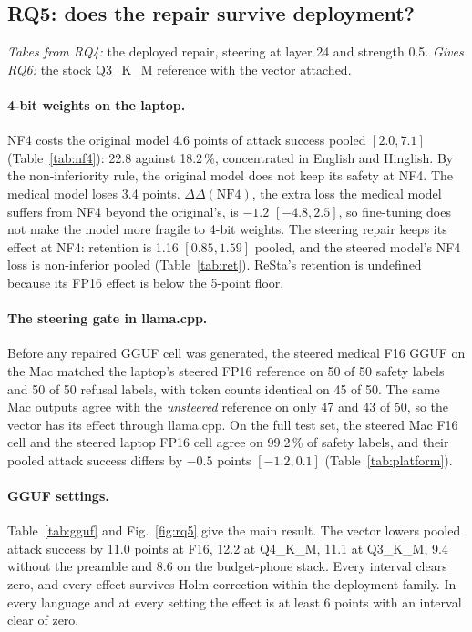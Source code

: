 \subsection{RQ5: does the repair survive deployment?}\label{sec:rq5}

\emph{Takes from RQ4:} the deployed repair, steering at layer 24 and strength 0.5. \emph{Gives RQ6:} the stock Q3\_K\_M reference with the vector attached.

\paragraph{4-bit weights on the laptop.} NF4 costs the original model 4.6 points of attack success pooled $[2.0, 7.1]$ (Table~\ref{tab:nf4}): 22.8 against 18.2\,\%, concentrated in English and Hinglish. By the non-inferiority rule, the original model does not keep its safety at NF4. The medical model loses 3.4 points. $\Delta\Delta(\mathrm{NF4})$, the extra loss the medical model suffers from NF4 beyond the original's, is $-1.2$ $[-4.8, 2.5]$, so fine-tuning does not make the model more fragile to 4-bit weights. The steering repair keeps its effect at NF4: retention is 1.16 $[0.85, 1.59]$ pooled, and the steered model's NF4 loss is non-inferior pooled (Table~\ref{tab:ret}). ReSta's retention is undefined because its FP16 effect is below the 5-point floor.



\paragraph{The steering gate in llama.cpp.} Before any repaired GGUF cell was generated, the steered medical F16 GGUF on the Mac matched the laptop's steered FP16 reference on 50 of 50 safety labels and 50 of 50 refusal labels, with token counts identical on 45 of 50. The same Mac outputs agree with the \emph{unsteered} reference on only 47 and 43 of 50, so the vector has its effect through llama.cpp. On the full test set, the steered Mac F16 cell and the steered laptop FP16 cell agree on 99.2\,\% of safety labels, and their pooled attack success differs by $-0.5$ points $[-1.2, 0.1]$ (Table~\ref{tab:platform}).

\paragraph{GGUF settings.} Table~\ref{tab:gguf} and Fig.~\ref{fig:rq5} give the main result. The vector lowers pooled attack success by 11.0 points at F16, 12.2 at Q4\_K\_M, 11.1 at Q3\_K\_M, 9.4 without the preamble and 8.6 on the budget-phone stack. Every interval clears zero, and every effect survives Holm correction within the deployment family. In every language and at every setting the effect is at least 6 points with an interval clear of zero.

